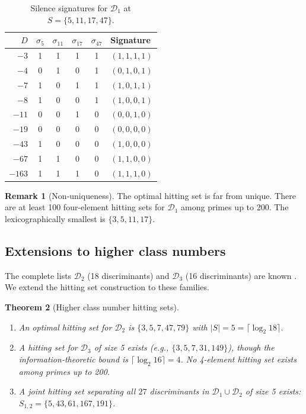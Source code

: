 \documentclass[11pt]{amsart}
\newtheorem{theorem}{Theorem}[section]
\theoremstyle{definition}
\newtheorem{remark}[theorem]{Remark}
\begin{document}
\begin{table}[ht]
\centering
\caption{Silence signatures for $\mathcal{D}_1$ at $S = \{5, 11, 17, 47\}$.}
\label{tab:signatures}
\begin{tabular}{r cccc l}
\toprule
$D$ & $\sigma_5$ & $\sigma_{11}$ & $\sigma_{17}$ & $\sigma_{47}$ & Signature \\
\midrule
$-3$ & 1 & 1 & 1 & 1 & $(1,1,1,1)$ \\
$-4$ & 0 & 1 & 0 & 1 & $(0,1,0,1)$ \\
$-7$ & 1 & 0 & 1 & 1 & $(1,0,1,1)$ \\
$-8$ & 1 & 0 & 0 & 1 & $(1,0,0,1)$ \\
$-11$ & 0 & 0 & 1 & 0 & $(0,0,1,0)$ \\
$-19$ & 0 & 0 & 0 & 0 & $(0,0,0,0)$ \\
$-43$ & 1 & 0 & 0 & 0 & $(1,0,0,0)$ \\
$-67$ & 1 & 1 & 0 & 0 & $(1,1,0,0)$ \\
$-163$ & 1 & 1 & 1 & 0 & $(1,1,1,0)$ \\
\bottomrule
\end{tabular}
\end{table}

\begin{remark}[Non-uniqueness]
The optimal hitting set is far from unique. There are at least 100 four-element hitting sets for $\mathcal{D}_1$ among primes up to 200. The lexicographically smallest is $\{3, 5, 11, 17\}$.
\end{remark}

\subsection{Extensions to higher class numbers}

The complete lists $\mathcal{D}_2$ (18 discriminants) and $\mathcal{D}_3$ (16 discriminants) are known \cite{watkins2004}. We extend the hitting set construction to these families.

\begin{theorem}[Higher class number hitting sets]\label{thm:higher}
\begin{enumerate}[label=(\roman*)]
\item An optimal hitting set for $\mathcal{D}_2$ is $\{3, 5, 7, 47, 79\}$ with $|S| = 5 = \lceil \log_2 18 \rceil$.
\item A hitting set for $\mathcal{D}_3$ of size 5 exists (e.g., $\{3, 5, 7, 31, 149\}$), though the information-theoretic bound is $\lceil \log_2 16 \rceil = 4$. No 4-element hitting set exists among primes up to 200.
\item A joint hitting set separating all $27$ discriminants in $\mathcal{D}_1 \cup \mathcal{D}_2$ of size 5 exists: $S_{1,2} = \{5, 43, 61, 167, 191\}$.
\end{enumerate}
\end{theorem}
\end{document}
